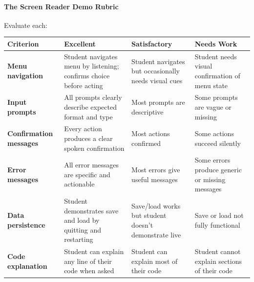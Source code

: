 \documentclass[
  justified,
  openright,
]{tufte-book}
\let\paragraph\paragraph
\let\paragraph\paragraph
\begin{document}
\paragraph{The Screen Reader Demo
Rubric}\label{the-screen-reader-demo-rubric}


 Evaluate each:

\begin{fullwidth}{\def\LTcaptype{none} %
\begin{longtable}[]{@{}
  >{\raggedright\arraybackslash}p{}
  >{\raggedright\arraybackslash}p{}
  >{\raggedright\arraybackslash}p{}
  >{\raggedright\arraybackslash}p{}@{}}
\toprule\noalign{}
\begin{minipage}[b]{\linewidth}\raggedright
Criterion
\end{minipage} & \begin{minipage}[b]{\linewidth}\raggedright
Excellent
\end{minipage} & \begin{minipage}[b]{\linewidth}\raggedright
Satisfactory
\end{minipage} & \begin{minipage}[b]{\linewidth}\raggedright
Needs Work
\end{minipage} \\
\midrule\noalign{}
\endhead
\bottomrule\noalign{}
\endlastfoot
\textbf{Menu navigation} & Student navigates menu by listening; confirms
choice before acting & Student navigates but occasionally needs visual
cues & Student needs visual confirmation of menu state \\
\textbf{Input prompts} & All prompts clearly describe expected format
and type & Most prompts are descriptive & Some prompts are vague or
missing \\
\textbf{Confirmation messages} & Every action produces a clear spoken
confirmation & Most actions confirmed & Some actions succeed silently \\
\textbf{Error messages} & All error messages are specific and actionable
& Most errors give useful messages & Some errors produce generic or
missing messages \\
\textbf{Data persistence} & Student demonstrates save and load by
quitting and restarting & Save/load works but student doesn't
demonstrate live & Save or load not fully functional \\
\textbf{Code explanation} & Student can explain any line of their code
when asked & Student can explain most of their code & Student cannot
explain sections of their code \\
\end{longtable}
}
\end{fullwidth}
\end{document}

